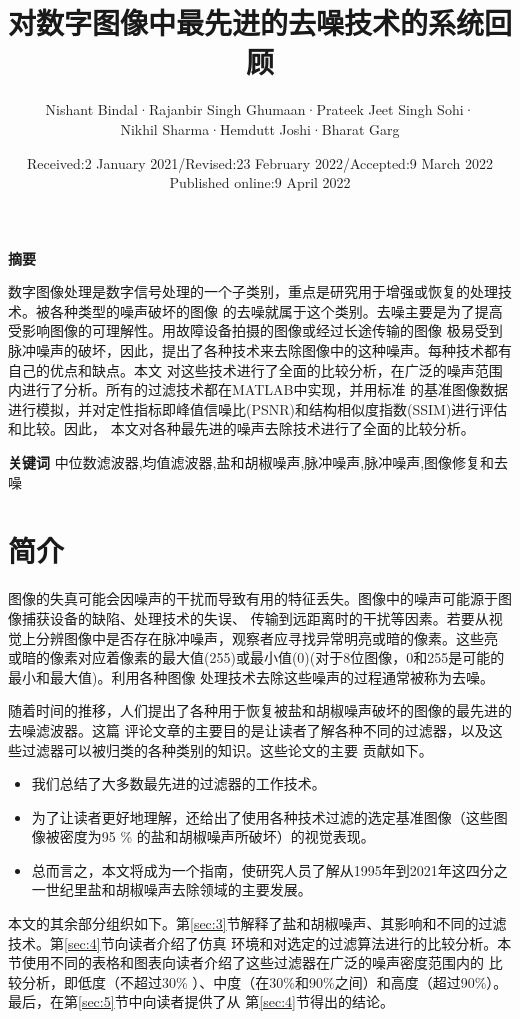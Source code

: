 \documentclass[12pt]{article} %
\title{对数字图像中最先进的去噪技术的系统回顾}  %
\author{Nishant Bindal·Rajanbir Singh Ghumaan·Prateek Jeet Singh Sohi·
 \\Nikhil Sharma·Hemdutt Joshi·Bharat Garg}%
\date{Received:2 January 2021/Revised:23 February 2022/Accepted:9 March 2022
\\Published online:9 April 2022}       %
\begin{document}
\maketitle          %

\textbf{摘要}

数字图像处理是数字信号处理的一个子类别，重点是研究用于增强或恢复的处理技术。被各种类型的噪声破坏的图像
的去噪就属于这个类别。去噪主要是为了提高受影响图像的可理解性。用故障设备拍摄的图像或经过长途传输的图像
极易受到脉冲噪声的破坏，因此，提出了各种技术来去除图像中的这种噪声。每种技术都有自己的优点和缺点。本文
对这些技术进行了全面的比较分析，在广泛的噪声范围内进行了分析。所有的过滤技术都在MATLAB中实现，并用标准
的基准图像数据进行模拟，并对定性指标即峰值信噪比(PSNR)和结构相似度指数(SSIM)进行评估和比较。因此，
本文对各种最先进的噪声去除技术进行了全面的比较分析。
\bigskip

\textbf{关键词}
\quad 中位数滤波器,均值滤波器,盐和胡椒噪声,脉冲噪声,脉冲噪声,图像修复和去噪

\section{简介}
图像的失真可能会因噪声的干扰而导致有用的特征丢失。图像中的噪声可能源于图像捕获设备的缺陷、处理技术的失误、
传输到远距离时的干扰等因素。若要从视觉上分辨图像中是否存在脉冲噪声，观察者应寻找异常明亮或暗的像素。这些亮
或暗的像素对应着像素的最大值(255)或最小值(0)(对于8位图像，0和255是可能的最小和最大值)。利用各种图像
处理技术去除这些噪声的过程通常被称为去噪。\par

\hspace{2em}随着时间的推移，人们提出了各种用于恢复被盐和胡椒噪声破坏的图像的最先进的去噪滤波器。这篇
评论文章的主要目的是让读者了解各种不同的过滤器，以及这些过滤器可以被归类的各种类别的知识。这些论文的主要
贡献如下。

\begin{itemize}
\item 我们总结了大多数最先进的过滤器的工作技术。
\item 为了让读者更好地理解，还给出了使用各种技术过滤的选定基准图像（这些图像被密度为95 \% 的盐和胡椒噪声所破坏）的视觉表现。
\item 总而言之，本文将成为一个指南，使研究人员了解从1995年到2021年这四分之一世纪里盐和胡椒噪声去除领域的主要发展。
\end{itemize}

\hspace{2em}本文的其余部分组织如下。第\ref{sec:3}节解释了盐和胡椒噪声、其影响和不同的过滤技术。第\ref{sec:4}节向读者介绍了仿真
环境和对选定的过滤算法进行的比较分析。本节使用不同的表格和图表向读者介绍了这些过滤器在广泛的噪声密度范围内的
比较分析，即低度（不超过30\% ）、中度（在30\%和90\%之间）和高度（超过90\%）。最后，在第\ref{sec:5}节中向读者提供了从
第\ref{sec:4}节得出的结论。
\end{document}
